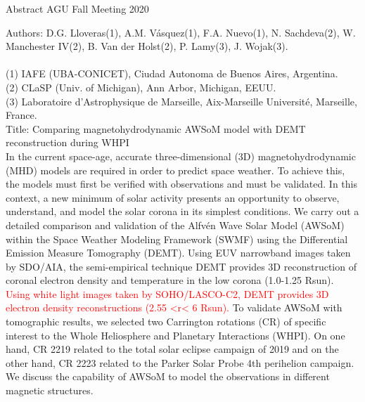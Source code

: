 \documentclass[a4paper,11pt]{report}
\begin{document}
\begin{center}
{\Large Abstract AGU Fall Meeting 2020}\\
\end{center}
Authors: D.G. Lloveras(1), A.M. Vásquez(1), F.A. Nuevo(1), N. Sachdeva(2), W. Manchester IV(2), B. Van der Holst(2), P. Lamy(3), J. Wojak(3).\\
\\
{\small
(1) IAFE (UBA-CONICET), Ciudad Autonoma de Buenos Aires, Argentina. \\
(2) CLaSP (Univ. of Michigan), Ann Arbor, Michigan, EEUU.}\\
(3) Laboratoire d’Astrophysique de Marseille, Aix-Marseille Université, Marseille, France.\\

{Title: Comparing magnetohydrodynamic AWSoM model with DEMT reconstruction during WHPI}\\

In the current space-age, accurate three-dimensional (3D) magnetohydrodynamic (MHD) models are required in order to predict space weather. To achieve this, the models must first be verified with observations and must be validated. In this context, a new minimum of solar activity presents an opportunity to observe, understand, and model the solar corona in its simplest conditions. We carry out a detailed comparison and validation of the Alfvén Wave Solar Model (AWSoM) within the Space Weather Modeling Framework (SWMF) using the Differential Emission Measure Tomography (DEMT). Using EUV narrowband images taken by SDO/AIA, the semi-empirical technique DEMT provides 3D reconstruction of coronal electron density and temperature in the low corona (1.0-1.25 Rsun). \textcolor{red}{Using white light images taken by SOHO/LASCO-C2, DEMT provides 3D electron density reconstructions (2.55 <r< 6 Rsun).} To validate AWSoM with tomographic results, we selected two Carrington rotations (CR) of specific interest to the Whole Heliosphere and Planetary Interactions (WHPI). On one hand, CR 2219 related to the total solar eclipse campaign of 2019 and on the other hand, CR 2223 related to the Parker Solar Probe 4th perihelion campaign. We discuss the capability of AWSoM to model the observations in different magnetic structures.
\end{document}
